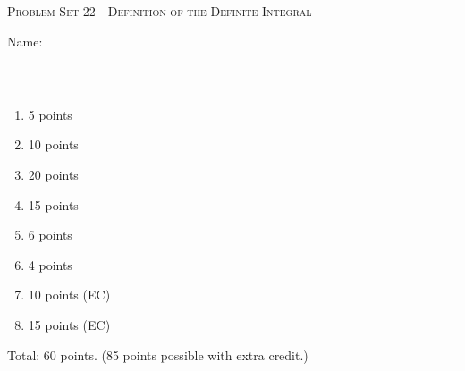 \documentclass{article}
\begin{document}
\begin{center}
\large\textsc{Problem Set 22 - Definition of the Definite Integral}
  
      \pspace{12pt}
  \begin{problemonly}\large Name: \rule{5cm}{0.15mm}\\ \end{problemonly}
\end{center}


\begin{grading}
\begin{enumerate}
    \item 5 points
    \item 10 points
    \item 20 points
    \item 15 points
    \item 6 points
    \item 4 points
    \item 10 points (EC)
    \item 15 points (EC)
\end{enumerate}
Total: 60 points. (85 points possible with extra credit.)
\end{grading}
\end{document}
